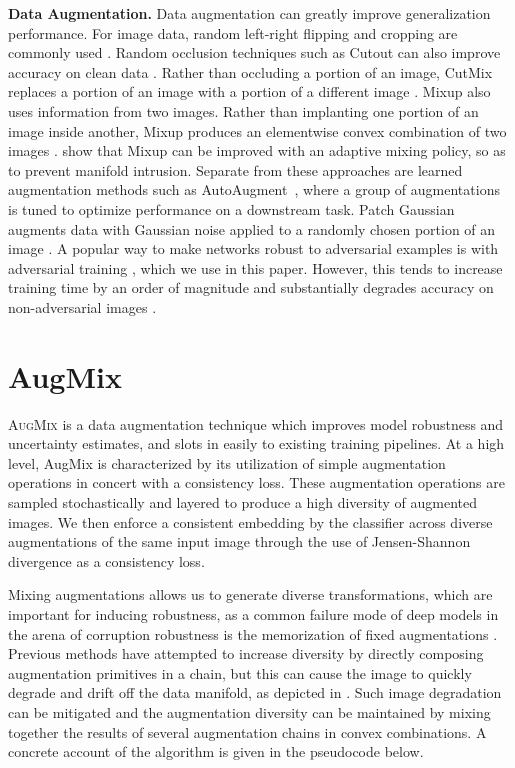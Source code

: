 \documentclass{article} \usepackage{iclr2020_conference,times}
\begin{document}
\noindent\textbf{Data Augmentation.}
Data augmentation can greatly improve generalization performance. For image data, random left-right flipping and cropping are commonly used \cite{resnet}.
Random occlusion techniques such as Cutout can also improve accuracy on clean data \citep{Devries2017ImprovedRO,Zhong2017RandomED}.
Rather than occluding a portion of an image, CutMix replaces a portion of an image with a portion of a different image \citep{Yun2019CutMixRS, Takahashi2019DataAU}.
Mixup also uses information from two images. Rather than implanting one portion of an image inside another, Mixup produces an elementwise convex combination of two images \citep{Zhang2017mixupBE, Tokozume2017BetweenClassLF}. \cite{GuoMixup} show that Mixup can be improved with an adaptive mixing policy, so as to prevent manifold intrusion.
Separate from these approaches are learned augmentation methods such as AutoAugment~\citep{Cubuk2018AutoAugmentLA}, where a group of augmentations is tuned to optimize performance on a downstream task.  Patch Gaussian augments data with Gaussian noise applied to a randomly chosen portion of an image \citep{Lopes2019ImprovingRW}.
A popular way to make networks robust to  adversarial examples is with adversarial training \citep{madry}, which we use in this paper. However, this tends to increase training time by an order of magnitude and substantially degrades accuracy on non-adversarial images \citep{Raghunathan2019AdversarialTC}.



\section{AugMix}



\textsc{AugMix} is a data augmentation technique which improves model robustness and uncertainty estimates, and slots in easily to existing training pipelines. At a high level, AugMix is characterized by its utilization of simple augmentation operations in concert with a consistency loss. These augmentation operations are sampled stochastically and layered to produce a high diversity of augmented images. We then enforce a consistent embedding by the classifier across diverse augmentations of the same input image through the use of Jensen-Shannon divergence as a consistency loss.

Mixing augmentations allows us to generate diverse transformations, which are important for inducing robustness, as a common failure mode of deep models in the arena of corruption robustness is the memorization of fixed augmentations \citep{igor, geirhos}. Previous methods have attempted to increase diversity by directly composing augmentation primitives in a chain, but this can cause the image to quickly degrade and drift off the data manifold, as depicted in . Such image degradation can be mitigated and the augmentation diversity can be maintained by mixing together the results of several augmentation chains in convex combinations. A concrete account of the algorithm is given in the pseudocode below.
\end{document}
